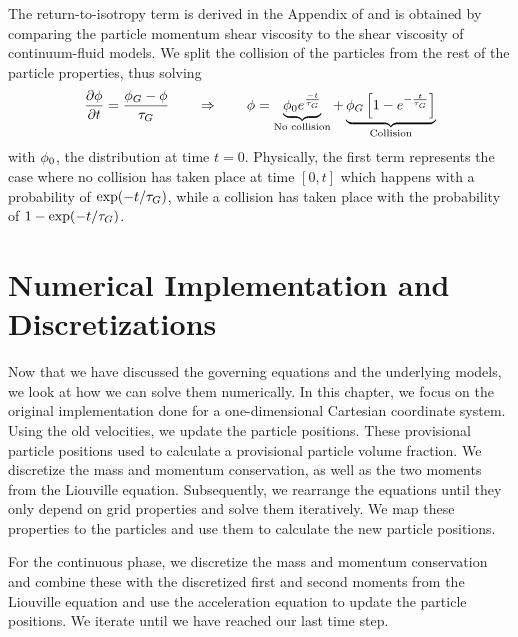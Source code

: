 The return-to-isotropy term is derived in the Appendix of \cite{isotropy} and is obtained by comparing the particle momentum shear viscosity to the shear viscosity of continuum-fluid models.
We split the collision of the particles from the rest of the particle properties, thus solving
\begin{equation}
    \dfrac{\partial \phi}{\partial t} = \dfrac{\phi_G - \phi}{\tau_G} \qquad \Rightarrow \qquad \phi= \underbrace{\phi_0 e^{\frac{-t}{\tau_G}}}_{\text{No collision}} + \underbrace{\phi_G \left[ 1 - e^{- \frac{t}{\tau_G}} \right]}_{\text{Collision}}
    \label{eq:rtiSol}
\end{equation}
with $\phi_0$, the distribution at time $t=0$.
Physically, the first term represents the case where no collision has taken place at time $[0,t]$ which happens with a probability of $\operatorname{exp}(-t / \tau_G)$, while a collision has taken place with the probability of $1 - \operatorname{exp}(-t / \tau_G)$.



\section{Numerical Implementation and Discretizations}
Now that we have discussed the governing equations and the underlying models, we look at how we can solve them numerically.
In this chapter, we focus on the original implementation done for a one-dimensional Cartesian coordinate system. 
Using the old velocities, we update the particle positions. 
These provisional particle positions used to calculate a provisional particle volume fraction. 
We discretize the mass and momentum conservation, as well as the two moments from the Liouville equation. 
Subsequently, we rearrange the equations until they only depend  on grid properties and solve them iteratively.
We map these properties to the particles and use them to calculate the new particle positions.


For the continuous phase, we discretize the mass and momentum conservation and combine these with the discretized first and second moments from the Liouville equation and use the acceleration equation to update the particle positions. 
We iterate until we have reached our last time step.

